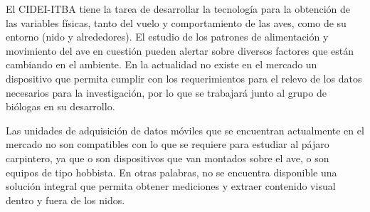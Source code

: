 El CIDEI-ITBA tiene la tarea de desarrollar la tecnología para la obtención de las variables físicas, tanto del vuelo y comportamiento de las aves, como de su entorno (nido y alrededores). El estudio de los patrones de alimentación y movimiento del ave en cuestión pueden alertar sobre diversos factores que están cambiando en el ambiente. En la actualidad no existe en el mercado un dispositivo que permita cumplir con los requerimientos para el relevo de los datos necesarios para la investigación, por lo que se trabajará junto al grupo de biólogas en su desarrollo.


Las unidades de adquisición de datos móviles que se encuentran actualmente en el mercado no son compatibles con lo que se requiere para estudiar al pájaro carpintero, ya que o son dispositivos que van montados sobre el ave, o son equipos de tipo hobbista. En otras palabras, no se encuentra disponible una solución integral que permita obtener mediciones y extraer contenido visual dentro y fuera de los nidos. 


%
